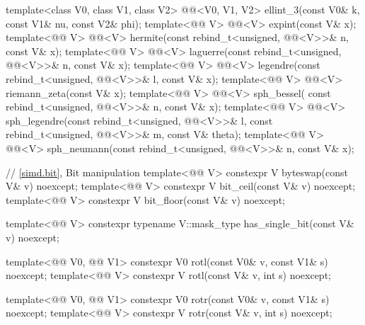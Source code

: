 \begin{codeblock}
{  template<class V0, class V1, class V2>
    @@<V0, V1, V2> ellint_3(const V0& k, const V1& nu, const V2& phi);
  template<@@ V> @@<V> expint(const V& x);
  template<@@ V>
    @@<V> hermite(const rebind_t<unsigned, @@<V>>& n, const V& x);
  template<@@ V>
    @@<V> laguerre(const rebind_t<unsigned, @@<V>>& n, const V& x);
  template<@@ V>
    @@<V> legendre(const rebind_t<unsigned, @@<V>>& l, const V& x);
  template<@@ V>
    @@<V> riemann_zeta(const V& x);
  template<@@ V>
    @@<V> sph_bessel(
      const rebind_t<unsigned, @@<V>>& n, const V& x);
  template<@@ V>
    @@<V> sph_legendre(const rebind_t<unsigned, @@<V>>& l,
      const rebind_t<unsigned, @@<V>>& m, const V& theta);
  template<@@ V>
    @@<V>
      sph_neumann(const rebind_t<unsigned, @@<V>>& n, const V& x);

  // \ref{simd.bit}, Bit manipulation
  template<@@ V> constexpr V byteswap(const V& v) noexcept;
  template<@@ V> constexpr V bit_ceil(const V& v) noexcept;
  template<@@ V> constexpr V bit_floor(const V& v) noexcept;

  template<@@ V>
    constexpr typename V::mask_type has_single_bit(const V& v) noexcept;

  template<@@ V0, @@ V1>
    constexpr V0 rotl(const V0& v, const V1& s) noexcept;
  template<@@ V>
    constexpr V  rotl(const V& v, int s) noexcept;

  template<@@ V0, @@ V1>
    constexpr V0 rotr(const V0& v, const V1& s) noexcept;
  template<@@ V>
    constexpr V  rotr(const V& v, int s) noexcept;

}
\end{codeblock}
